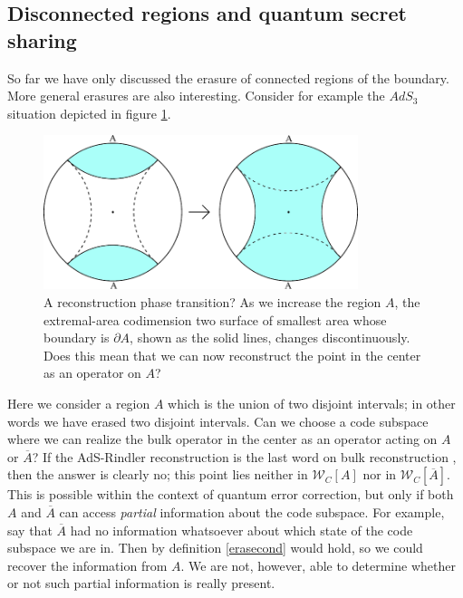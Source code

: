 \documentclass[12pt]{article}
\newcommand{\W}{\mathcal{W}}
\newcommand{\ol}{\overline}
\begin{document}
\subsection{Disconnected regions and quantum secret sharing}\label{discsec}
So far we have only discussed the erasure of connected regions of the boundary.  More general erasures are also interesting. Consider for example  the $AdS_3$ situation depicted in figure \ref{multiplefig}. 
\begin{figure}
\begin{center}
\includegraphics[height=4.5cm]{multiplefig.pdf}
\caption{A reconstruction phase transition?  As we increase the region $A$, the extremal-area codimension two surface of smallest area whose boundary is $\partial A$, shown as the solid lines, changes discontinuously.  Does this mean that we can now reconstruct the point in the center as an operator on $A$?}\label{multiplefig}
\end{center}
\end{figure}
Here we consider a region $A$ which is the union of two disjoint intervals; in other words we have erased two disjoint intervals.  Can we choose a code subspace where we can realize the bulk operator in the center as an operator acting on $A$ or $\ol{A}$?  If the AdS-Rindler reconstruction is the last word on bulk reconstruction \cite{Bousso:2012sj}, then the answer is clearly no; this point lies neither in $\W_C[A]$ nor in $\W_C[\ol{A}]$.  This is possible within the context of quantum error correction, but only if both $A$ and $\ol{A}$ can access \textit{partial} information about the code subspace.  For example, say that $\ol{A}$ had no information whatsoever about which state of the code subspace we are in.  Then by definition \eqref{erasecond} would hold, so we could recover the information from $A$.  We are not, however, able to determine whether or not such partial information is really present.
\end{document}
